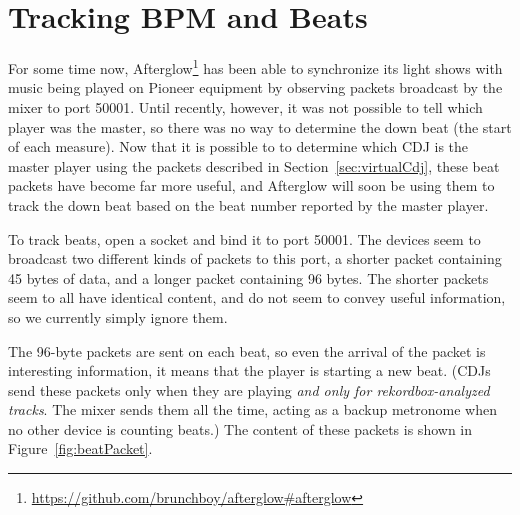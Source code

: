 \documentclass[11pt]{article}
\begin{document}
\section{Tracking BPM and Beats}
\label{sec:beatPackets}

For some time now,
Afterglow\footnote{\url{https://github.com/brunchboy/afterglow\#afterglow}}
has been able to synchronize its light shows with music being played
on Pioneer equipment by observing packets broadcast by the mixer to
port 50001. Until recently, however, it was not possible to tell which
player was the master, so there was no way to determine the down beat
(the start of each measure). Now that it is possible to to determine
which CDJ is the master player using the packets described in
Section~\ref{sec:virtualCdj}, these beat packets have become far more
useful, and Afterglow will soon be using them to track the down beat
based on the beat number reported by the master player.

To track beats, open a socket and bind it to port 50001. The devices
seem to broadcast two different kinds of packets to this port, a
shorter packet containing 45 bytes of data, and a longer packet
containing 96 bytes. The shorter packets seem to all have identical
content, and do not seem to convey useful information, so we currently
simply ignore them.

The 96-byte packets are sent on each beat, so even the arrival of the
packet is interesting information, it means that the player is
starting a new beat. (CDJs send these packets only when they are
playing \emph{and only for rekordbox-analyzed tracks}. The mixer sends
them all the time, acting as a backup metronome when no other device
is counting beats.) The content of these packets is shown in
Figure~\ref{fig:beatPacket}.
\end{document}
